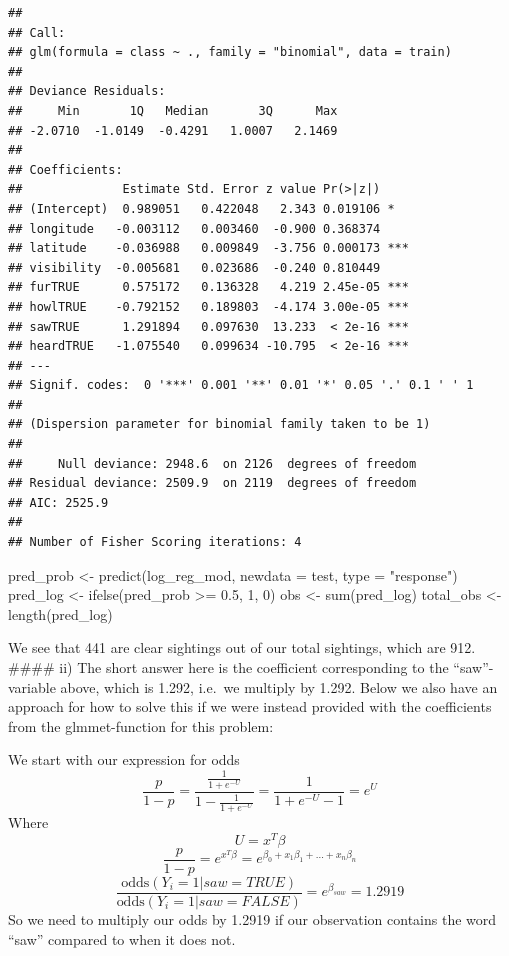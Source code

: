 \documentclass[
]{article}
\newenvironment{Shaded}{\begin{snugshade}}{\end{snugshade}}
\newcommand{\AttributeTok}[1]{\textcolor[rgb]{0.77,0.63,0.00}{#1}}
\newcommand{\DecValTok}[1]{\textcolor[rgb]{0.00,0.00,0.81}{#1}}
\newcommand{\FloatTok}[1]{\textcolor[rgb]{0.00,0.00,0.81}{#1}}
\newcommand{\FunctionTok}[1]{\textcolor[rgb]{0.00,0.00,0.00}{#1}}
\newcommand{\NormalTok}[1]{#1}
\newcommand{\OtherTok}[1]{\textcolor[rgb]{0.56,0.35,0.01}{#1}}
\newcommand{\SpecialCharTok}[1]{\textcolor[rgb]{0.00,0.00,0.00}{#1}}
\newcommand{\StringTok}[1]{\textcolor[rgb]{0.31,0.60,0.02}{#1}}
\begin{document}
\begin{verbatim}
## 
## Call:
## glm(formula = class ~ ., family = "binomial", data = train)
## 
## Deviance Residuals: 
##     Min       1Q   Median       3Q      Max  
## -2.0710  -1.0149  -0.4291   1.0007   2.1469  
## 
## Coefficients:
##              Estimate Std. Error z value Pr(>|z|)    
## (Intercept)  0.989051   0.422048   2.343 0.019106 *  
## longitude   -0.003112   0.003460  -0.900 0.368374    
## latitude    -0.036988   0.009849  -3.756 0.000173 ***
## visibility  -0.005681   0.023686  -0.240 0.810449    
## furTRUE      0.575172   0.136328   4.219 2.45e-05 ***
## howlTRUE    -0.792152   0.189803  -4.174 3.00e-05 ***
## sawTRUE      1.291894   0.097630  13.233  < 2e-16 ***
## heardTRUE   -1.075540   0.099634 -10.795  < 2e-16 ***
## ---
## Signif. codes:  0 '***' 0.001 '**' 0.01 '*' 0.05 '.' 0.1 ' ' 1
## 
## (Dispersion parameter for binomial family taken to be 1)
## 
##     Null deviance: 2948.6  on 2126  degrees of freedom
## Residual deviance: 2509.9  on 2119  degrees of freedom
## AIC: 2525.9
## 
## Number of Fisher Scoring iterations: 4
\end{verbatim}

\begin{Shaded}
\begin{Highlighting}[]
\NormalTok{pred\_prob }\OtherTok{\textless{}{-}} \FunctionTok{predict}\NormalTok{(log\_reg\_mod, }\AttributeTok{newdata =}\NormalTok{ test, }\AttributeTok{type =} \StringTok{"response"}\NormalTok{)}
\NormalTok{pred\_log }\OtherTok{\textless{}{-}} \FunctionTok{ifelse}\NormalTok{(pred\_prob }\SpecialCharTok{\textgreater{}=} \FloatTok{0.5}\NormalTok{, }\DecValTok{1}\NormalTok{, }\DecValTok{0}\NormalTok{)}
\NormalTok{obs }\OtherTok{\textless{}{-}} \FunctionTok{sum}\NormalTok{(pred\_log)}
\NormalTok{total\_obs }\OtherTok{\textless{}{-}} \FunctionTok{length}\NormalTok{(pred\_log)}
\end{Highlighting}
\end{Shaded}

We see that 441 are clear sightings out of our total sightings, which
are 912. \#\#\#\# ii) The short answer here is the coefficient
corresponding to the ``saw''-variable above, which is 1.292, i.e.~we
multiply by 1.292. Below we also have an approach for how to solve this
if we were instead provided with the coefficients from the
glmmet-function for this problem:

We start with our expression for odds \[
\frac{p}{1-p} = \frac{\frac{1}{1+e^{-U}}}{1-\frac{1}{1+e^{-U}}} = \frac{1}{1 + e^{-U} - 1} = e^U
\] Where \[
U = x^T \beta
\] \[
\frac{p}{1-p} = e^{x^T \beta} = e^{\beta_0 + x_1 \beta_1 + ... + x_n \beta_n}
\] \[ 
\frac{\text{odds}(Y_i = 1 | saw = TRUE)}{\text{odds}(Y_i = 1 | saw = FALSE)} = e^{\beta_{saw}} = 1.2919
\] So we need to multiply our odds by 1.2919 if our observation contains
the word ``saw'' compared to when it does not.
\end{document}

